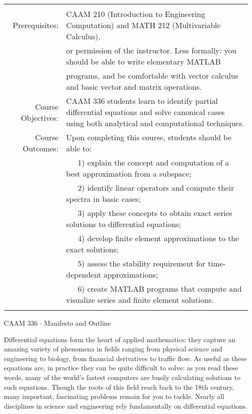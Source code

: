 \documentclass[10pt]{article}
\begin{document}
\begin{tabular}{rp{42em}}
\hline & \\[-.5em]
Prerequisites:           & CAAM 210 (Introduction to Engineering Computation) and MATH 212 (Multivariable Calculus), \\
                         & or permission of the instructor.   Less formally: you should be able to write elementary MATLAB\\
                         & programs, and be comfortable with vector calculus and basic vector and matrix operations.\\[1.25em]

Course Objectives:       & CAAM 336 students learn to identify partial differential equations
                                and solve canonical cases using both analytical and computational techniques.\\[1em]
%
Course Outcomes:         & Upon completing this course, students should be able to:\\
                         & \ \ \ 1) explain the concept and computation of a best approximation from a subspace;\\
                         & \ \ \ 2) identify linear operators and compute their spectra in basic cases;\\
                         & \ \ \ 3) apply these concepts to obtain exact series solutions to differential equations;\\
                         & \ \ \ 4) develop finite element approximations to the exact solutions;\\
                         & \ \ \ 5) assess the stability requirement for time-dependent approximations;\\
                         & \ \ \ 6) create MATLAB programs that compute and visualize series and finite element solutions. \\[1em] 
%
\hline & \\[-.5em]
\end{tabular}

\vspace*{-1em}
\begin{center} 
   CAAM 336 $\cdot$ Manifesto and Outline
\end{center}

\vspace*{-1em}

Differential equations form the heart of applied mathematics:
they capture an amazing variety of phenomena in fields ranging from 
physical science and engineering to biology, from financial derivatives
to traffic flow.
As useful as these equations are, in practice they can be quite
difficult to solve:  as you read these words, many of the world's 
fastest computers are busily calculating solutions to such equations.
Though the roots of this field reach back to the 18th century,
many important, fascinating problems remain for you to tackle.
Nearly all disciplines in science and engineering rely 
fundamentally on differential equations.
\end{document}
